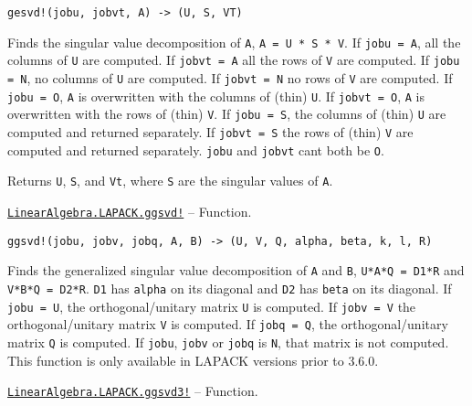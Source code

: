 \begin{adjustwidth}{2em}{0pt}


\begin{verbatim}
gesvd!(jobu, jobvt, A) -> (U, S, VT)
\end{verbatim}

Finds the singular value decomposition of \texttt{A}, \texttt{A = U * S * V{\textquotesingle}}. If \texttt{jobu = A}, all the columns of \texttt{U} are computed. If \texttt{jobvt = A} all the rows of \texttt{V{\textquotesingle}} are computed. If \texttt{jobu = N}, no columns of \texttt{U} are computed. If \texttt{jobvt = N} no rows of \texttt{V{\textquotesingle}} are computed. If \texttt{jobu = O}, \texttt{A} is overwritten with the columns of (thin) \texttt{U}. If \texttt{jobvt = O}, \texttt{A} is overwritten with the rows of (thin) \texttt{V{\textquotesingle}}. If \texttt{jobu = S}, the columns of (thin) \texttt{U} are computed and returned separately. If \texttt{jobvt = S} the rows of (thin) \texttt{V{\textquotesingle}} are computed and returned separately. \texttt{jobu} and \texttt{jobvt} can{\textquotesingle}t both be \texttt{O}.

Returns \texttt{U}, \texttt{S}, and \texttt{Vt}, where \texttt{S} are the singular values of \texttt{A}.



\end{adjustwidth}
\hypertarget{1835214761811297196}{} 
\hyperlink{1835214761811297196}{\texttt{LinearAlgebra.LAPACK.ggsvd!}}  -- {Function.}

\begin{adjustwidth}{2em}{0pt}


\begin{verbatim}
ggsvd!(jobu, jobv, jobq, A, B) -> (U, V, Q, alpha, beta, k, l, R)
\end{verbatim}

Finds the generalized singular value decomposition of \texttt{A} and \texttt{B}, \texttt{U{\textquotesingle}*A*Q = D1*R} and \texttt{V{\textquotesingle}*B*Q = D2*R}. \texttt{D1} has \texttt{alpha} on its diagonal and \texttt{D2} has \texttt{beta} on its diagonal. If \texttt{jobu = U}, the orthogonal/unitary matrix \texttt{U} is computed. If \texttt{jobv = V} the orthogonal/unitary matrix \texttt{V} is computed. If \texttt{jobq = Q}, the orthogonal/unitary matrix \texttt{Q} is computed. If \texttt{jobu}, \texttt{jobv} or \texttt{jobq} is \texttt{N}, that matrix is not computed. This function is only available in LAPACK versions prior to 3.6.0.



\end{adjustwidth}
\hypertarget{14749391167207110611}{} 
\hyperlink{14749391167207110611}{\texttt{LinearAlgebra.LAPACK.ggsvd3!}}  -- {Function.}

